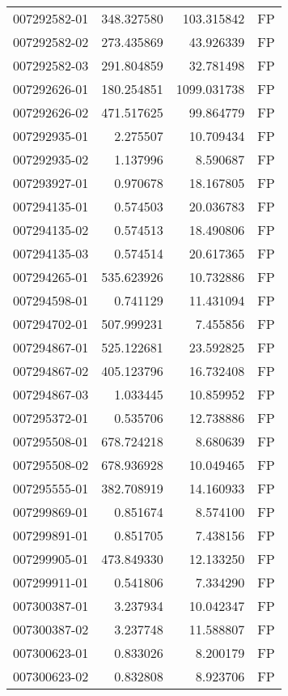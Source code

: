 \begin{tabular}{lrrl}
007292582-01 &  348.327580 &   103.315842 &   FP \\
007292582-02 &  273.435869 &    43.926339 &   FP \\
007292582-03 &  291.804859 &    32.781498 &   FP \\
007292626-01 &  180.254851 &  1099.031738 &   FP \\
007292626-02 &  471.517625 &    99.864779 &   FP \\
007292935-01 &    2.275507 &    10.709434 &   FP \\
007292935-02 &    1.137996 &     8.590687 &   FP \\
007293927-01 &    0.970678 &    18.167805 &   FP \\
007294135-01 &    0.574503 &    20.036783 &   FP \\
007294135-02 &    0.574513 &    18.490806 &   FP \\
007294135-03 &    0.574514 &    20.617365 &   FP \\
007294265-01 &  535.623926 &    10.732886 &   FP \\
007294598-01 &    0.741129 &    11.431094 &   FP \\
007294702-01 &  507.999231 &     7.455856 &   FP \\
007294867-01 &  525.122681 &    23.592825 &   FP \\
007294867-02 &  405.123796 &    16.732408 &   FP \\
007294867-03 &    1.033445 &    10.859952 &   FP \\
007295372-01 &    0.535706 &    12.738886 &   FP \\
007295508-01 &  678.724218 &     8.680639 &   FP \\
007295508-02 &  678.936928 &    10.049465 &   FP \\
007295555-01 &  382.708919 &    14.160933 &   FP \\
007299869-01 &    0.851674 &     8.574100 &   FP \\
007299891-01 &    0.851705 &     7.438156 &   FP \\
007299905-01 &  473.849330 &    12.133250 &   FP \\
007299911-01 &    0.541806 &     7.334290 &   FP \\
007300387-01 &    3.237934 &    10.042347 &   FP \\
007300387-02 &    3.237748 &    11.588807 &   FP \\
007300623-01 &    0.833026 &     8.200179 &   FP \\
007300623-02 &    0.832808 &     8.923706 &   FP \\

\end{tabular}
